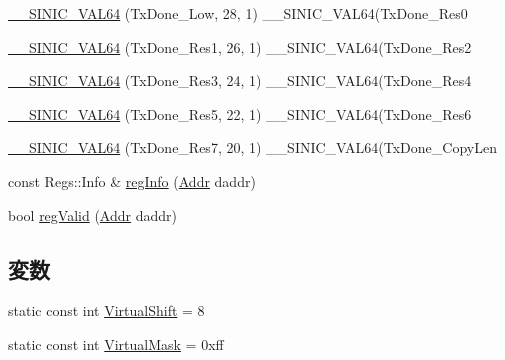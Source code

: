\begin{DoxyCompactItemize}
\item 
\hyperlink{namespaceSinic_1_1Regs_a42a2d957bef61bfe83e833f88dcb925b}{\_\-\_\-SINIC\_\-VAL64} (TxDone\_\-Low, 28, 1) \_\-\_\-SINIC\_\-VAL64(TxDone\_\-Res0
\item 
\hyperlink{namespaceSinic_1_1Regs_ab8855564b0d8a0f52607d6b83fd6c6ab}{\_\-\_\-SINIC\_\-VAL64} (TxDone\_\-Res1, 26, 1) \_\-\_\-SINIC\_\-VAL64(TxDone\_\-Res2
\item 
\hyperlink{namespaceSinic_1_1Regs_a4bd7c6ed99d7e28ea474505fc26ef0c7}{\_\-\_\-SINIC\_\-VAL64} (TxDone\_\-Res3, 24, 1) \_\-\_\-SINIC\_\-VAL64(TxDone\_\-Res4
\item 
\hyperlink{namespaceSinic_1_1Regs_a5f79ddf6ede0e8be182ff9a7cf66f912}{\_\-\_\-SINIC\_\-VAL64} (TxDone\_\-Res5, 22, 1) \_\-\_\-SINIC\_\-VAL64(TxDone\_\-Res6
\item 
\hyperlink{namespaceSinic_1_1Regs_a580467be57553482595f25dc434f86c8}{\_\-\_\-SINIC\_\-VAL64} (TxDone\_\-Res7, 20, 1) \_\-\_\-SINIC\_\-VAL64(TxDone\_\-CopyLen
\item 
const Regs::Info \& \hyperlink{namespaceSinic_aed2d64d4f995743e60f0fee5cca4e739}{regInfo} (\hyperlink{base_2types_8hh_af1bb03d6a4ee096394a6749f0a169232}{Addr} daddr)
\item 
bool \hyperlink{namespaceSinic_af92abee16113e5012fa829e4935d917a}{regValid} (\hyperlink{base_2types_8hh_af1bb03d6a4ee096394a6749f0a169232}{Addr} daddr)
\end{DoxyCompactItemize}
\subsection*{変数}
\begin{DoxyCompactItemize}
\item 
static const int \hyperlink{namespaceSinic_1_1Regs_ad3df16c90c6e9c90e4fe95c9ad269661}{VirtualShift} = 8
\item 
static const int \hyperlink{namespaceSinic_1_1Regs_aac1ea6e4b2ca262e0a4bb0b729a7ef3e}{VirtualMask} = 0xff
\end{DoxyCompactItemize}


